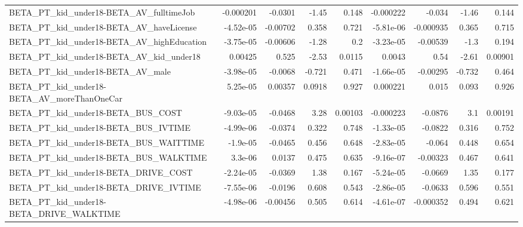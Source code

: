 \begin{tabular}{lrrrrrrrr}
BETA\_PT\_kid\_under18-BETA\_AV\_fulltimeJob            &   -0.000201 &      -0.0301 &    -1.45 &    0.148 &  -0.000222 &      -0.034 &        -1.46 &         0.144 \\
BETA\_PT\_kid\_under18-BETA\_AV\_haveLicense            &   -4.52e-05 &     -0.00702 &    0.358 &    0.721 &  -5.81e-06 &   -0.000935 &        0.365 &         0.715 \\
BETA\_PT\_kid\_under18-BETA\_AV\_highEducation          &   -3.75e-05 &     -0.00606 &    -1.28 &      0.2 &  -3.23e-05 &    -0.00539 &         -1.3 &         0.194 \\
BETA\_PT\_kid\_under18-BETA\_AV\_kid\_under18            &     0.00425 &        0.525 &    -2.53 &   0.0115 &     0.0043 &        0.54 &        -2.61 &       0.00901 \\
BETA\_PT\_kid\_under18-BETA\_AV\_male                   &   -3.98e-05 &      -0.0068 &   -0.721 &    0.471 &  -1.66e-05 &    -0.00295 &       -0.732 &         0.464 \\
BETA\_PT\_kid\_under18-BETA\_AV\_moreThanOneCar         &    5.25e-05 &      0.00357 &   0.0918 &    0.927 &   0.000221 &       0.015 &        0.093 &         0.926 \\
BETA\_PT\_kid\_under18-BETA\_BUS\_COST                  &   -9.03e-05 &      -0.0468 &     3.28 &  0.00103 &  -0.000223 &     -0.0876 &          3.1 &       0.00191 \\
BETA\_PT\_kid\_under18-BETA\_BUS\_IVTIME                &   -4.99e-06 &      -0.0374 &    0.322 &    0.748 &  -1.33e-05 &     -0.0822 &        0.316 &         0.752 \\
BETA\_PT\_kid\_under18-BETA\_BUS\_WAITTIME              &    -1.9e-05 &      -0.0465 &    0.456 &    0.648 &  -2.83e-05 &      -0.064 &        0.448 &         0.654 \\
BETA\_PT\_kid\_under18-BETA\_BUS\_WALKTIME              &     3.3e-06 &       0.0137 &    0.475 &    0.635 &  -9.16e-07 &    -0.00323 &        0.467 &         0.641 \\
BETA\_PT\_kid\_under18-BETA\_DRIVE\_COST                &   -2.24e-05 &      -0.0369 &     1.38 &    0.167 &  -5.24e-05 &     -0.0669 &         1.35 &         0.177 \\
BETA\_PT\_kid\_under18-BETA\_DRIVE\_IVTIME              &   -7.55e-06 &      -0.0196 &    0.608 &    0.543 &  -2.86e-05 &     -0.0633 &        0.596 &         0.551 \\
BETA\_PT\_kid\_under18-BETA\_DRIVE\_WALKTIME            &   -4.98e-06 &     -0.00456 &    0.505 &    0.614 &  -4.61e-07 &   -0.000352 &        0.494 &         0.621 \\

\end{tabular}
